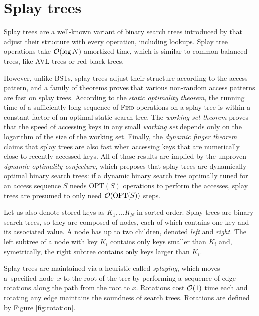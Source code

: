 \chapter{Splay trees}
\label{chapter:splay}
Splay trees are a well-known variant of binary search trees introduced
by \cite{splay} that adjust their structure with every operation, including
lookups. Splay tree operations take $\mathcal{O}(\log N)$ amortized time, which is
similar to common balanced trees, like AVL trees or red-black trees.

However, unlike BSTs, splay trees adjust their structure
according to the access pattern, and a family of theorems proves that
various non-random access patterns are fast on splay trees.
According to the \emph{static optimality theorem}, the running time
of a sufficiently long sequence of \textsc{Find} operations on a splay tree
is within a constant factor of an optimal static search tree.
The \emph{working set theorem} proves that the speed of accessing keys in
any small \emph{working set} depends only on the logarithm of the size
of the working set.
Finally, the \emph{dynamic finger theorem} claims that splay trees are also
fast when accessing keys that are numerically close to recently accessed keys.
All of these results are implied by the unproven \emph{dynamic optimality
conjecture}, which proposes that splay trees are dynamically optimal binary
search trees: if a dynamic binary search tree optimally tuned for an access
sequence $S$ needs $\mathrm{OPT}(S)$ operations to perform the accesses, splay
trees are presumed to only need $\mathcal{O}(\mathrm{OPT}(S))$ steps.

Let us also denote stored keys as $K_1,\ldots K_N$ in sorted order.
Splay trees are binary search trees, so they are composed of nodes, each of
which contains one key and its associated value. A node has up to two children,
denoted \emph{left} and \emph{right}.
The left subtree of a node with key $K_i$ contains only keys smaller than $K_i$
and, symetrically, the right subtree contains only keys larger than $K_i$.

Splay trees are maintained via a heuristic called \emph{splaying}, which
moves a~specified node~$x$ to the root of the tree by performing a~sequence
of edge rotations along the path from the root to $x$.
Rotations cost $\mathcal{O}(1)$ time each and rotating any edge maintains
the soundness of search trees. Rotations are defined by Figure
\ref{fig:rotation}.

\newcommand{\hunk}[2]{ node [splay_hunk] (hunk#1-#2) {#1} }

